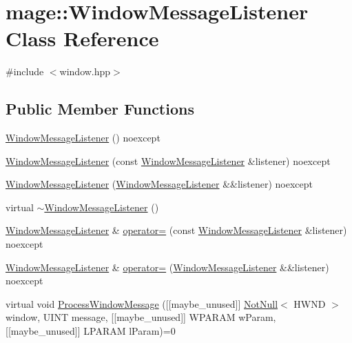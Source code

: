 \hypertarget{classmage_1_1_window_message_listener}{}\section{mage\+:\+:Window\+Message\+Listener Class Reference}
\label{classmage_1_1_window_message_listener}


{\ttfamily \#include $<$window.\+hpp$>$}

\subsection*{Public Member Functions}
\begin{DoxyCompactItemize}
\item 
\mbox{\hyperlink{classmage_1_1_window_message_listener_aff8433123e461b636275cbdded24ead2}{Window\+Message\+Listener}} () noexcept
\item 
\mbox{\hyperlink{classmage_1_1_window_message_listener_a41a34991bfeb38d37685b1f8a7d90d1e}{Window\+Message\+Listener}} (const \mbox{\hyperlink{classmage_1_1_window_message_listener}{Window\+Message\+Listener}} \&listener) noexcept
\item 
\mbox{\hyperlink{classmage_1_1_window_message_listener_a5d90d0e20cda37ee83a00696fb40f3c3}{Window\+Message\+Listener}} (\mbox{\hyperlink{classmage_1_1_window_message_listener}{Window\+Message\+Listener}} \&\&listener) noexcept
\item 
virtual \mbox{\hyperlink{classmage_1_1_window_message_listener_ae0972346e59184cb01d674dfa8269d32}{$\sim$\+Window\+Message\+Listener}} ()
\item 
\mbox{\hyperlink{classmage_1_1_window_message_listener}{Window\+Message\+Listener}} \& \mbox{\hyperlink{classmage_1_1_window_message_listener_a6c4b5ae43b7c1e14d16c3ba639746804}{operator=}} (const \mbox{\hyperlink{classmage_1_1_window_message_listener}{Window\+Message\+Listener}} \&listener) noexcept
\item 
\mbox{\hyperlink{classmage_1_1_window_message_listener}{Window\+Message\+Listener}} \& \mbox{\hyperlink{classmage_1_1_window_message_listener_a74dee5de5b949db3eb755936ee15ecb9}{operator=}} (\mbox{\hyperlink{classmage_1_1_window_message_listener}{Window\+Message\+Listener}} \&\&listener) noexcept
\item 
virtual void \mbox{\hyperlink{classmage_1_1_window_message_listener_a79f2782fa7bd3d1b50cf62cdd3f5c549}{Process\+Window\+Message}} (\mbox{[}\mbox{[}maybe\+\_\+unused\mbox{]}\mbox{]} \mbox{\hyperlink{namespacemage_a8769f9d670d6b585ea306cb1062af94b}{Not\+Null}}$<$ H\+W\+ND $>$ window, U\+I\+NT message, \mbox{[}\mbox{[}maybe\+\_\+unused\mbox{]}\mbox{]} W\+P\+A\+R\+AM w\+Param, \mbox{[}\mbox{[}maybe\+\_\+unused\mbox{]}\mbox{]} L\+P\+A\+R\+AM l\+Param)=0
\end{DoxyCompactItemize}


